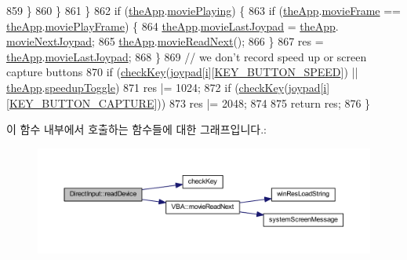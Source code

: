 \begin{DoxyCode}
859             \}
860         \}
861     \}
862     \textcolor{keywordflow}{if} (\mbox{\hyperlink{_v_b_a_8cpp_a8095a9d06b37a7efe3723f3218ad8fb3}{theApp}}.\mbox{\hyperlink{class_v_b_a_ac490c27ebc24ea8fbccf42e2909d04ed}{moviePlaying}}) \{
863         \textcolor{keywordflow}{if} (\mbox{\hyperlink{_v_b_a_8cpp_a8095a9d06b37a7efe3723f3218ad8fb3}{theApp}}.\mbox{\hyperlink{class_v_b_a_ae1d2d002a3d425b509b93171e8ade926}{movieFrame}} == \mbox{\hyperlink{_v_b_a_8cpp_a8095a9d06b37a7efe3723f3218ad8fb3}{theApp}}.\mbox{\hyperlink{class_v_b_a_afcffae74eebd4424790f8c48faede1c8}{moviePlayFrame}}) \{
864             \mbox{\hyperlink{_v_b_a_8cpp_a8095a9d06b37a7efe3723f3218ad8fb3}{theApp}}.\mbox{\hyperlink{class_v_b_a_a911d9dbab0a3565480a29b8149099ed1}{movieLastJoypad}} = \mbox{\hyperlink{_v_b_a_8cpp_a8095a9d06b37a7efe3723f3218ad8fb3}{theApp}}.
      \mbox{\hyperlink{class_v_b_a_ae528fc1f675add097200192deecb4236}{movieNextJoypad}};
865             \mbox{\hyperlink{_v_b_a_8cpp_a8095a9d06b37a7efe3723f3218ad8fb3}{theApp}}.\mbox{\hyperlink{class_v_b_a_a0f0d982604ac77d23e7fd474c4ebbe2c}{movieReadNext}}();
866         \}
867         res = \mbox{\hyperlink{_v_b_a_8cpp_a8095a9d06b37a7efe3723f3218ad8fb3}{theApp}}.\mbox{\hyperlink{class_v_b_a_a911d9dbab0a3565480a29b8149099ed1}{movieLastJoypad}};
868     \}
869     \textcolor{comment}{// we don't record speed up or screen capture buttons}
870     \textcolor{keywordflow}{if} (\mbox{\hyperlink{_direct_input_8cpp_a30b902f7fcac3e98c962cafe9fc11a80}{checkKey}}(\mbox{\hyperlink{_direct_input_8cpp_a2407686323030ec0e04e588c07092342}{joypad}}[\mbox{\hyperlink{expr-lex_8cpp_acb559820d9ca11295b4500f179ef6392}{i}}][\mbox{\hyperlink{_s_d_l_8cpp_abc5c98fcc1211af2b80116dd6e0a035da9cff5f87f377ca825fcdd98865480f13}{KEY\_BUTTON\_SPEED}}]) || 
      \mbox{\hyperlink{_v_b_a_8cpp_a8095a9d06b37a7efe3723f3218ad8fb3}{theApp}}.\mbox{\hyperlink{class_v_b_a_aab299545104f6df869bf8f7abee6ef0a}{speedupToggle}})
871         res |= 1024;
872     \textcolor{keywordflow}{if} (\mbox{\hyperlink{_direct_input_8cpp_a30b902f7fcac3e98c962cafe9fc11a80}{checkKey}}(\mbox{\hyperlink{_direct_input_8cpp_a2407686323030ec0e04e588c07092342}{joypad}}[\mbox{\hyperlink{expr-lex_8cpp_acb559820d9ca11295b4500f179ef6392}{i}}][\mbox{\hyperlink{_s_d_l_8cpp_abc5c98fcc1211af2b80116dd6e0a035da67e58823e71e69a28c0cf30a8923a256}{KEY\_BUTTON\_CAPTURE}}]))
873         res |= 2048;
874 
875     \textcolor{keywordflow}{return} res;
876 \}
\end{DoxyCode}
이 함수 내부에서 호출하는 함수들에 대한 그래프입니다.\+:
\nopagebreak
\begin{figure}[H]
\begin{center}
\leavevmode
\includegraphics[width=350pt]{class_direct_input_af7d74c03d302905eaa06e88ab37b7dac_cgraph}
\end{center}
\end{figure}
